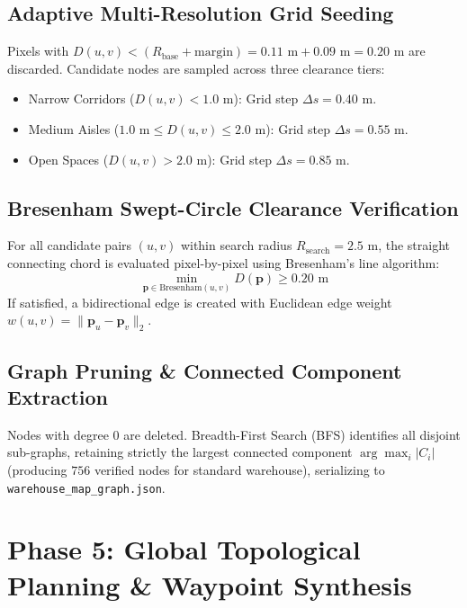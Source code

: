 \documentclass[10pt,a4paper]{article}
\begin{document}
\subsection{Adaptive Multi-Resolution Grid Seeding}
Pixels with $D(u, v) < (R_{\text{base}} + \text{margin}) = 0.11\text{ m} + 0.09\text{ m} = 0.20\text{ m}$ are discarded. Candidate nodes are sampled across three clearance tiers:
\begin{itemize}
    \item Narrow Corridors ($D(u, v) < 1.0\text{ m}$): Grid step $\Delta s = 0.40\text{ m}$.
    \item Medium Aisles ($1.0\text{ m} \le D(u, v) \le 2.0\text{ m}$): Grid step $\Delta s = 0.55\text{ m}$.
    \item Open Spaces ($D(u, v) > 2.0\text{ m}$): Grid step $\Delta s = 0.85\text{ m}$.
\end{itemize}

\subsection{Bresenham Swept-Circle Clearance Verification}
For all candidate pairs $(u, v)$ within search radius $R_{\text{search}} = 2.5\text{ m}$, the straight connecting chord is evaluated pixel-by-pixel using Bresenham's line algorithm:
\begin{equation}
\min_{\mathbf{p} \in \text{Bresenham}(u, v)} D(\mathbf{p}) \ge 0.20\text{ m}
\end{equation}
If satisfied, a bidirectional edge is created with Euclidean edge weight $w(u, v) = \|\mathbf{p}_u - \mathbf{p}_v\|_2$.

\subsection{Graph Pruning \& Connected Component Extraction}
Nodes with degree $0$ are deleted. Breadth-First Search (BFS) identifies all disjoint sub-graphs, retaining strictly the largest connected component $\arg\max_i |C_i|$ (producing $756$ verified nodes for standard warehouse), serializing to \texttt{warehouse\_map\_graph.json}.

\section{Phase 5: Global Topological Planning \& Waypoint Synthesis}
\end{document}
